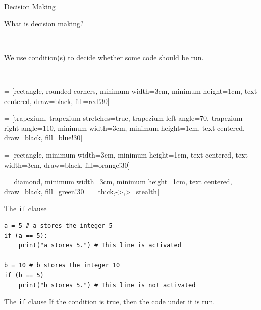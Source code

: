 \documentclass[dvipsnames, svgnames, x11names]{beamer}
\begin{document}
\begin{frame}{Decision Making}
\begin{center}
What is decision making? \pause 

\

We use condition(s) to decide whether some code should be run.

\

 = [rectangle, rounded corners, 
minimum width=3cm, 
minimum height=1cm,
text centered, 
draw=black, 
fill=red!30]

 = [trapezium, 
trapezium stretches=true, %
trapezium left angle=70, 
trapezium right angle=110, 
minimum width=3cm, 
minimum height=1cm, text centered, 
draw=black, fill=blue!30]

 = [rectangle, 
minimum width=3cm, 
minimum height=1cm, 
text centered, 
text width=3cm, 
draw=black, 
fill=orange!30]

 = [diamond, 
minimum width=3cm, 
minimum height=1cm, 
text centered, 
draw=black, 
fill=green!30]
 = [thick,->,>=stealth]

\end{center}
\end{frame}

\begin{frame}[fragile]{The \texttt{if} clause}
\begin{verbatim}
a = 5 # a stores the integer 5
if (a == 5):
	print("a stores 5.") # This line is activated
	
b = 10 # b stores the integer 10
if (b == 5)
	print("b stores 5.") # This line is not activated
\end{verbatim}
\begin{block}{The \texttt{if} clause}
If the condition is true, then the code under it is run.
\end{block}
\end{frame}
\end{document}
